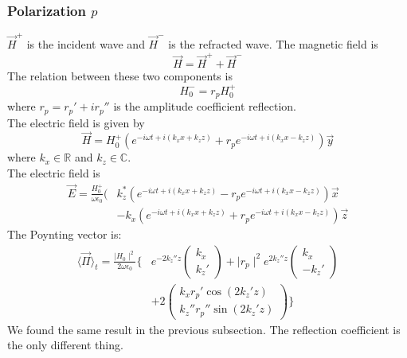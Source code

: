 \subsubsection{Polarization $p$}
$\vec{H}^+$ is the incident wave and $\vec{H}^-$ is the refracted wave. The magnetic field is
\begin{equation*}
\vec{H}=\vec{H}^++\vec{H}^-
\end{equation*}
The relation between these two components is
\begin{equation*}
H^-_0=r_pH^+_0
\end{equation*}
where $r_p=r_p'+ir_p''$ is the amplitude coefficient reflection.\\
The electric field is given by $$\vec{H}=H^+_0(e^{-i\omega t+i(k_xx+k_zz)}+r_pe^{-i\omega t+i(k_xx-k_zz)})\vec{y}$$
where $k_x\in \mathbb{R}$ and $k_z\in \mathbb{C}$.\\
The electric field is\\
\begin{align*}
\vec{E}=\frac{H^{+}_0}{\omega \epsilon _0}(&k_z^*(e^{-i\omega t+i(k_xx+k_zz)}-r_pe^{-i\omega t+i(k_xx-k_zz)})\vec{x}\\
&-k_x(e^{-i\omega t+i(k_xx+k_zz)}+r_pe^{-i\omega t+i(k_xx-k_zz)})\vec{z}
\end{align*}
The Poynting vector is:\\
\begin{align*}
\langle \vec{\Pi} \rangle _t= \displaystyle\frac{\displaystyle \mid H_0\mid ^2}{\displaystyle 2\omega \epsilon _0}\Big\{&
e^{-2k_z''z}
\begin{pmatrix}
k_x\\
k_z'
\end{pmatrix}
+\mid r_p\mid ^2e^{2k_z''z}
\begin{pmatrix}
k_x\\
-k_z'
\end{pmatrix}\\
&+2
\begin{pmatrix}
k_xr_p'\cos(2k_z'z)\\
k_z''r_p''\sin(2k_z'z)
\end{pmatrix}
\Big\}
\end{align*}
We found the same result in the previous subsection. The reflection coefficient is the only different thing.
